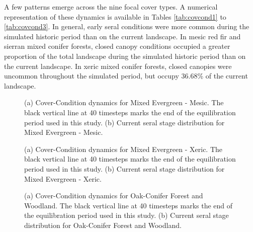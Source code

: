 A few patterns emerge across the nine focal cover types. A numerical representation of these dynamics is available in Tables \ref{tab:covcond1} to \ref{tab:covcond3}. In general, early seral conditions were more common during the simulated historic period than on the current landscape. In mesic red fir and sierran mixed conifer forests, closed canopy conditions occupied a greater proportion of the total landscape during the simulated historic period than on the current landscape. In xeric mixed conifer forests, closed canopies were uncommon throughout the simulated period, but occupy 36.68\% of the current landscape.
\begin{figure}[!htbp]
  \centering
  \caption{(a) Cover-Condition dynamics for Mixed Evergreen - Mesic. The black vertical line at 40 timesteps marks the end of the equilibration period used in this study. (b) Current seral stage distribution for Mixed Evergreen - Mesic.}
\label{fig:covcond_megm}
\end{figure}


\begin{figure}[!htbp]
  \centering
  \caption{(a) Cover-Condition dynamics for Mixed Evergreen - Xeric. The black vertical line at 40 timesteps marks the end of the equilibration period used in this study. (b) Current seral stage distribution for Mixed Evergreen - Xeric.} 
  \label{fig:covcond_megx}
\end{figure}

\begin{figure}[!htbp]
  \centering
  \caption{(a) Cover-Condition dynamics for Oak-Conifer Forest and Woodland. The black vertical line at 40 timesteps marks the end of the equilibration period used in this study. (b) Current seral stage distribution for Oak-Conifer Forest and Woodland.} 
  \label{fig:covcond_ocfw}
\end{figure}

